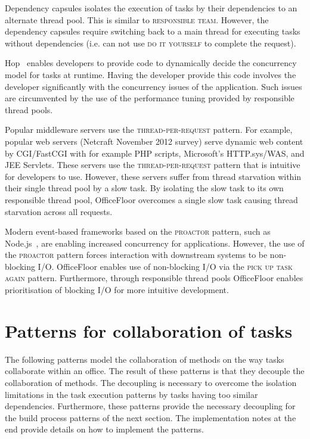 \documentclass[prodmode]{style/acmlarge}
\begin{document}
Dependency capsules \cite{dependency-capsules} isolates the execution of tasks
by their dependencies to an alternate thread pool.  This is similar to
\textsc{responsible team}.  However, the dependency capsules require switching
back to a main thread for executing tasks without dependencies (i.e. can not use
\textsc{do it yourself} to complete the request).

Hop~\cite{hop} enables developers to provide code to dynamically decide the
concurrency model for tasks at runtime.  Having the developer provide this code
involves the developer significantly with the concurrency issues of the
application.  Such issues are circumvented by the use of the performance tuning
provided by responsible thread pools.

Popular middleware servers use the \textsc{thread-per-request} pattern.
For example, popular web servers (Netcraft November 2012 survey) serve dynamic
web content by CGI/FastCGI with for example PHP scripts, Microsoft's
HTTP.sys/WAS, and JEE Servlets. These servers use the
\textsc{thread-per-request} pattern that is intuitive for developers to use.
However, these servers suffer from thread starvation within their single thread
pool by a slow task.  By isolating the slow task to its own responsible thread
pool, OfficeFloor overcomes a single slow task causing thread starvation across
all requests.

Modern event-based frameworks based on the \textsc{proactor} pattern, such as
Node.js~\cite{nodejs}, are enabling increased concurrency for applications.
However, the use of the \textsc{proactor} pattern forces interaction with
downstream systems to be non-blocking I/O.  OfficeFloor enables use of
non-blocking I/O via the \textsc{pick up task again} pattern.  Furthermore,
through responsible thread pools OfficeFloor enables prioritisation of blocking
I/O for more intuitive development.




\section{Patterns for collaboration of tasks}

The following patterns model the collaboration of methods on the way tasks
collaborate within an office.  The result of these patterns is that they
decouple the collaboration of methods.  The decoupling is necessary to overcome
the isolation limitations in the task execution patterns by tasks having too
similar dependencies.  Furthermore, these patterns provide the necessary
decoupling for the build process patterns of the next section.  The
implementation notes at the end provide details on how to implement the
patterns.
\end{document}

